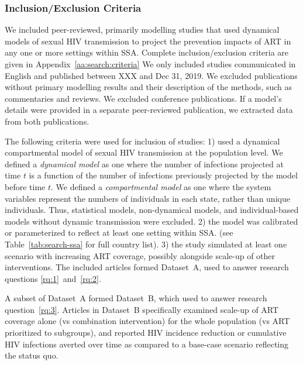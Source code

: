\subsubsection{Inclusion/Exclusion Criteria}
\label{sss:meth:criteria}
We included peer-reviewed, primarily modelling studies that used dynamical models of sexual HIV transmission
to project the prevention impacts of ART in any one or more settings within SSA.
Complete inclusion/exclusion criteria are given in 
Appendix~\ref{aa:search:criteria}
We only included studies communicated in English and published between XXX and Dec 31, 2019.
We excluded publications without primary modelling results and their description of the methods,
such as commentaries and reviews. We excluded conference publications.
If a model's details were provided in a separate peer-reviewed publication, we extracted data from both publications. %
\par
The following criteria were used for inclusion of studies:
1) used a dynamical compartmental model of
sexual HIV transmission at the population level.
We defined a \emph{dynamical model} as one where
the number of infections projected at time $t$ is a function of
the number of infections previously projected by the model before time $t$. %
We defined a \emph{compartmental model} as one where
the system variables represent the numbers of individuals in each state,
rather than unique individuals. %
Thus, statistical models, non-dynamical models, and individual-based models without dynamic transmission were excluded.
2) the model was calibrated or parameterized to reflect at least one setting within SSA.
(see Table~\ref{tab:search-ssa} for full country list).
3) the study simulated at least one scenario with increasing ART coverage,
possibly alongside scale-up of other interventions.
The included articles formed Dataset~A,
used to answer research questions \ref{rq:1}~and~\ref{rq:2}.
\par
A subset of Dataset~A formed Dataset~B,
which used to answer research question~\ref{rq:3}.
Articles in Dataset~B specifically examined
scale-up of ART coverage alone (vs combination intervention)
for the whole population (vs ART prioritized to subgroups),  %
and reported HIV incidence reduction or cumulative HIV infections averted over time 
as compared to a base-case scenario reflecting the status quo.
